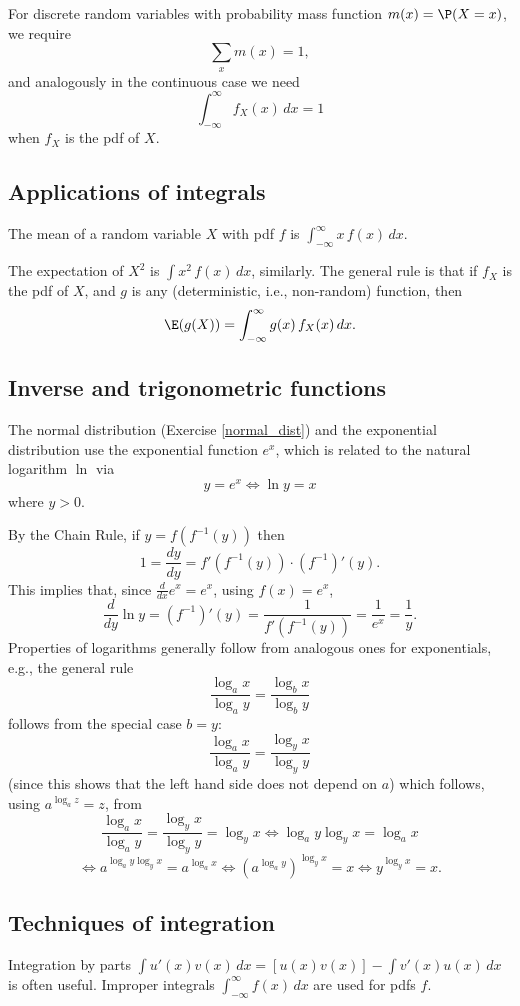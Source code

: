 For discrete random variables with probability mass function $m(x)=\P(X=x)$, we require
\[
\sum_x m(x)=1,
\]
and analogously in the continuous case we need
\[
\int_{-\infty}^\infty f_X(x)\,dx=1
\]
when $f_X$ is the pdf of $X$.
\subsection{Applications of integrals}%

The mean of a random variable $X$ with pdf $f$ is $\int_{-\infty}^\infty x\,f(x)\,dx$.

The expectation of $X^2$ is $\int x^2\,f(x)\,dx$, similarly. The general rule is that if $f_X$ is the pdf of $X$, and $g$ is any (deterministic, i.e., non-random) function, then
\[
\E(g(X)) = \int_{-\infty}^\infty g(x)\,f_X(x)\,dx.
\]

\subsection{Inverse and trigonometric functions}%

The normal distribution (Exercise \ref{normal_dist}) and the exponential distribution use the exponential function $e^x$, which is related to the natural logarithm $\ln$ via
\[
	y=e^x\iff \ln y=x
\]
where $y>0$.

By the Chain Rule, if $y=f(f^{-1}(y))$ then
\[
	1 = \frac{dy}{dy} = f'(f^{-1}(y))\cdot (f^{-1})'(y).
\]
This implies that, since $\frac{d}{dx} e^x=e^x$, using $f(x)=e^x$,
\[
\frac{d}{dy}\ln y = (f^{-1})'(y)=\frac1{f'(f^{-1}(y))} = \frac1{e^x} = \frac1y.
\]
Properties of logarithms generally follow from analogous ones for exponentials, e.g., the general rule
\[
\frac{\log_a x}{\log_a y} = \frac{\log_b x}{\log_b y}
\]
follows from the special case $b=y$:
\[
\frac{\log_a x}{\log_a y} = \frac{\log_y x}{\log_y y}
\]
(since this shows that the left hand side does not depend on $a$)
which follows, using $a^{\log_a z}=z$, from
\[
\frac{\log_a x}{\log_a y} = \frac{\log_y x}{\log_y y}=\log_y x\iff \log_a y\log_y x = \log_a x
\]
\[
\iff a^{\log_a y\log_y x} = a^{\log_a x}
\iff (a^{\log_a y})^{\log_y x}=x
\iff y^{\log_y x}=x.
\]

\subsection{Techniques of integration}

Integration by parts $\int u'(x)v(x)\,dx=[u(x)v(x)]-\int v'(x)u(x)\,dx$ is often useful. %
Improper integrals $\int_{-\infty}^\infty f(x)\,dx$ are used for pdfs $f$.

